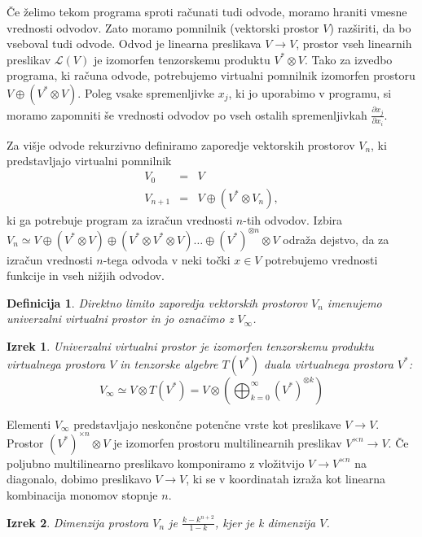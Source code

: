 \documentclass{article}
\newtheorem{definicija}{Definicija}[section]
\newtheorem{izrek}{Izrek}[section]
\begin{document}
Če želimo tekom programa sproti računati tudi odvode, moramo hraniti vmesne
vrednosti odvodov. Zato moramo pomnilnik (vektorski prostor $V$) razširiti, da
bo vseboval tudi odvode. Odvod je linearna preslikava $V\to V$, prostor
vseh linearnih preslikav $\mathcal{L}(V)$ je izomorfen tenzorskemu produktu
$V^*\otimes V$. Tako za izvedbo programa, ki računa odvode, potrebujemo virtualni
pomnilnik izomorfen prostoru $V\oplus (V^*\otimes V)$. Poleg vsake spremenljivke $x_j$, ki
jo uporabimo v programu, si moramo zapomniti še vrednosti odvodov po vseh
ostalih spremenljivkah $\frac{\partial x_j}{\partial x_i}$.   

Za višje odvode rekurzivno definiramo zaporedje vektorskih prostorov $V_n$, ki
predstavljajo virtualni pomnilnik
\begin{eqnarray}\label{eq:V_n}
  \label{eq:prapor}
  V_0 &=& V\\
  V_{n+1}&=&V\oplus (V^*\otimes V_n),
\end{eqnarray} 
ki ga potrebuje program za izračun vrednosti $n$-tih odvodov. Izbira $V_n\simeq
V\oplus (V^*\otimes V) \oplus (V^*\otimes V^*\otimes V) \ldots \oplus
(V^*)^{\otimes n}\otimes V$ odraža dejstvo, da za izračun vrednosti $n$-tega odvoda v neki točki $x\in V$
potrebujemo vrednosti funkcije in vseh nižjih odvodov.
\begin{definicija}
  Direktno limito zaporedja vektorskih prostorov $V_n$ imenujemo
  \emph{univerzalni virtualni prostor} in jo označimo z $V_\infty$.
\end{definicija}
\begin{izrek}
  Univerzalni virtualni prostor je izomorfen tenzorskemu produktu virtualnega
  prostora $V$ in tenzorske algebre $T(V^*)$ duala virtualnega prostora $V^*$:
  \begin{equation}
\label{eq:tenzor_algebra}
    V_\infty\simeq V\otimes T(V^*) = V \otimes\left(\bigoplus_{k=0}^\infty (V^*)^{\otimes k} \right)
\end{equation}

\end{izrek}

Elementi $V_\infty$ predstavljajo neskončne potenčne vrste kot preslikave 
$V\to V$. Prostor $(V^*)^{\times n}\otimes V$ je izomorfen prostoru
multilinearnih preslikav $V^{\times n}\to V$. Če poljubno
multilinearno preslikavo komponiramo z vložitvijo $V\to V^{\times n}$ na
diagonalo, dobimo preslikavo $V\to V$, ki se v koordinatah izraža kot linearna
kombinacija monomov stopnje $n$.

\begin{izrek}
 Dimenzija prostora $V_n$ je $\frac{k-k^{n+2}}{1-k}$, kjer je k dimenzija $V$.
 \end{izrek}
\end{document}
